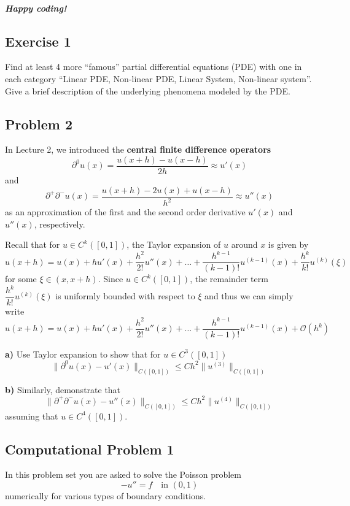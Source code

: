\documentclass[11pt]{article}
\begin{document}
\subparagraph{Happy coding!}\label{happy-coding}

    \subsection{Exercise 1}\label{exercise-1}

Find at least 4 more ``famous'' partial differential equations (PDE)
with one in each category ``Linear PDE, Non-linear PDE, Linear System,
Non-linear system''. Give a brief description of the underlying
phenomena modeled by the PDE.

    \subsection{Problem 2}\label{problem-2}

In Lecture 2, we introduced the \textbf{central finite difference
operators} \[
\partial^0 u(x)
=  \dfrac{u(x+h) - u(x-h)}
{2h}
\approx u'(x)
\] and \[
\partial^+ \partial^- u(x)
=  \dfrac{u(x+h) - 2 u(x) + u(x-h)}
{h^2}
\approx u''(x)
\] as an approximation of the first and the second order derivative
\(u'(x)\) and \(u''(x)\), respectively.

Recall that for \(u \in C^k([0,1])\), the Taylor expansion of \(u\)
around \(x\) is given by \[
u(x+h) = u(x) + h u'(x) + \dfrac{h^2}{2!} u''(x) 
+ \ldots 
+ \dfrac{h^{k-1}}{(k-1)!} u^{(k-1)}(x)
+ \dfrac{h^{k}}{k!} u^{(k)}(\xi)
\] for some \(\xi \in (x,x+h)\). Since \(u \in C^k([0,1])\), the
remainder term \(\dfrac{h^k}{k!} u^{(k)}(\xi)\) is uniformly bounded
with respect to \(\xi\) and thus we can simply write \[
u(x+h) = u(x) + h u'(x) + \dfrac{h^2}{2!} u''(x) 
+ \ldots 
+ \dfrac{h^{k-1}}{(k-1)!} u^{(k-1)}(x)
+ \mathcal{O}(h^k)
\]

\textbf{a)} Use Taylor expansion to show that for \(u \in C^3([0,1])\)
\[
\| \partial^0u(x) - u'(x) \|_{C([0,1])}
\leqslant 
C h^2
 \| u^{(3)} \|_{C([0,1])}
\]

\textbf{b)} Similarly, demonstrate that \[
\| \partial^+ \partial^-u(x) - u''(x) \|_{C([0,1])}
\leqslant 
C h^2
 \| u^{(4)} \|_{C([0,1])}
\] assuming that \(u \in C^4([0,1])\).

    \subsection{Computational Problem 1}\label{computational-problem-1}

In this problem set you are asked to solve the Poisson problem \[
- u''  = f \quad \text{in } (0,1)
\] numerically for various types of boundary conditions.
\end{document}
